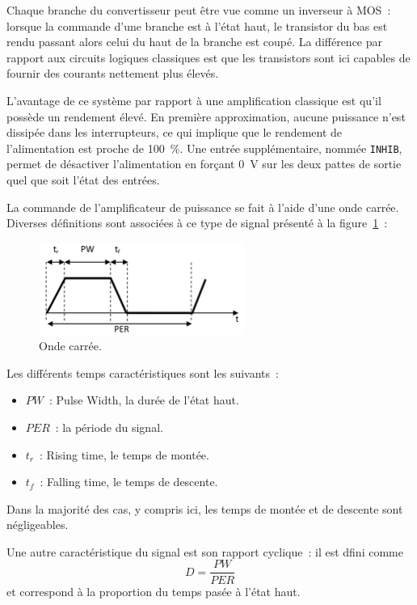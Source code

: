 \documentclass[11pt,a4paper]{article}
\theoremstyle{definition}%
\begin{document}
Chaque branche du convertisseur peut être vue comme un inverseur à MOS~: lorsque la commande d’une branche est à l’état haut, le transistor du bas est rendu passant alors celui du haut de la branche est coupé.
La différence par rapport aux circuits logiques classiques est que les transistors sont ici capables de fournir des courants nettement plus élevés.

L’avantage de ce système par rapport à une amplification classique est qu’il possède un rendement élevé.
En première approximation, aucune puissance n’est dissipée dans les interrupteurs, ce qui implique que le rendement de l’alimentation est proche de 100~\%.
Une entrée supplémentaire, nommée \texttt{INHIB}, permet de désactiver l’alimentation en forçant 0~V sur les deux pattes de sortie quel que soit l’état des entrées.

La commande de l’amplificateur de puissance se fait à l’aide d’une onde carrée.
Diverses définitions sont associées à ce type de signal présenté à la figure~\ref{fig:square-wave}~:

\begin{figure}[H]
\center
\includegraphics[width=0.6\textwidth]{square-wave}
\caption{Onde carrée.}
\label{fig:square-wave}
\end{figure}

Les différents temps caractéristiques sont les suivants~:
\begin{itemize}
	\item $PW$~: Pulse Width, la durée de l'état haut.
	\item $PER$~: la période du signal.
	\item $t_r$~: Rising time, le temps de montée.
	\item $t_f$~: Falling time, le temps de descente.
\end{itemize}

Dans la majorité des cas, y compris ici, les temps de montée et de descente sont négligeables.

Une autre caractéristique du signal est son rapport cyclique~: il est dfini comme \[D = \frac{PW}{PER}\]
et correspond à la proportion du temps pasée à l'état haut.
\end{document}
